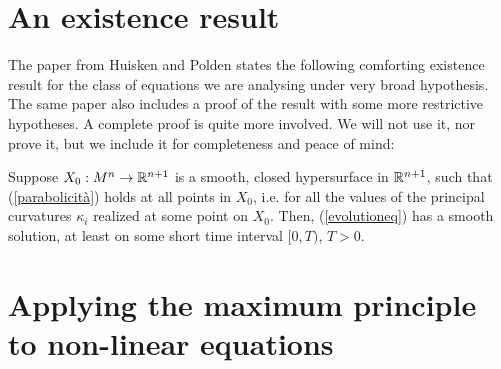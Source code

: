 \section{An existence result}
The paper from Huisken and Polden \cite{huisken} states the following comforting existence result for the class of equations we are analysing under very broad hypothesis. The same paper also includes a proof of the result with some more restrictive hypotheses. A complete proof is quite more involved. We will not use it, nor prove it, but we include it for completeness and peace of mind: 

\begin{theorem}
Suppose $X_0 : M^n \rightarrow \mathbb{R}^{n+1}$ is a smooth, closed hypersurface in $\mathbb{R}^{n+1}$, such that (\ref{parabolicità}) holds at all points in $X_0$, i.e. for all the values of the principal curvatures $\kappa_{i}$ realized at some point on $X_0$. Then, (\ref{evolutioneq}) has a smooth solution, at least on some short time interval $[0, T)$, $T > 0$.  \label{existence}
\end{theorem}


\section{Applying the maximum principle to non-linear equations}

